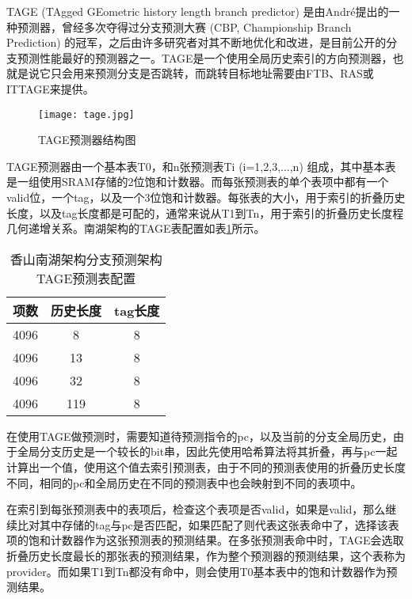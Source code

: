 TAGE (TAgged GEometric history length branch predictor) 是由André提出的一种预测器\cite{tage}，曾经多次夺得过分支预测大赛 (CBP, Championship Branch Prediction) 的冠军，之后由许多研究者对其不断地优化和改进，是目前公开的分支预测性能最好的预测器之一。TAGE是一个使用全局历史索引的方向预测器，也就是说它只会用来预测分支是否跳转，而跳转目标地址需要由FTB、RAS或ITTAGE来提供。


\begin{figure}[htb]
	\centering
	\setlength\tabcolsep{3pt}  %
	\vspace{5pt} %
	\texttt{[image: tage.jpg]}
	\caption{TAGE预测器结构图\cite{tage}}
	\label{fig:figure23}
\end{figure}

TAGE预测器由一个基本表T0，和n张预测表Ti (i=1,2,3,...,n) 组成，其中基本表是一组使用SRAM存储的2位饱和计数器。而每张预测表的单个表项中都有一个valid位，一个tag，以及一个3位饱和计数器。每张表的大小，用于索引的折叠历史长度，以及tag长度都是可配的，通常来说从T1到Tn，用于索引的折叠历史长度程几何递增关系。南湖架构的TAGE表配置如表\ref{tb:table21}所示。

\begin{table}[]
	\caption{香山南湖架构分支预测架构TAGE预测表配置}
	\label{tb:table21}
	\centering
	\begin{tabular}{|c|c|c|}
		\hline
		项数   & 历史长度   & tag长度   \\ \hline
		4096 & 8 & 8 \\ \hline
		4096 & 13 & 8 \\ \hline
		4096 & 32 & 8 \\ \hline
		4096 & 119 & 8 \\ \hline
	\end{tabular}
\end{table}

在使用TAGE做预测时，需要知道待预测指令的pc，以及当前的分支全局历史，由于全局分支历史是一个较长的bit串，因此先使用哈希算法将其折叠，再与pc一起计算出一个值，使用这个值去索引预测表，由于不同的预测表使用的折叠历史长度不同，相同的pc和全局历史在不同的预测表中也会映射到不同的表项中。

在索引到每张预测表中的表项后，检查这个表项是否valid，如果是valid，那么继续比对其中存储的tag与pc是否匹配，如果匹配了则代表这张表命中了，选择该表项的饱和计数器作为这张预测表的预测结果。在多张预测表命中时，TAGE会选取折叠历史长度最长的那张表的预测结果，作为整个预测器的预测结果，这个表称为provider。而如果T1到Tn都没有命中，则会使用T0基本表中的饱和计数器作为预测结果。

